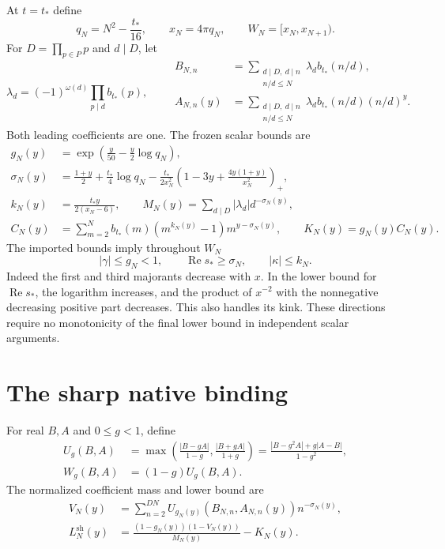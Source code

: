 \documentclass[11pt]{article}
\theoremstyle{remark}
\newcommand{\tstar}{t_*}
\newcommand{\Lsharp}{L_N^{\mathrm{sh}}}
\newcommand{\pos}[1]{\left(#1\right)_+}
\DeclareMathOperator{\Rea}{Re}
\numberwithin{equation}{section}
\begin{document}
At $t=\tstar$ define
\begin{equation}\label{eq:window}
 q_N=N^2-\frac{\tstar}{16},\qquad x_N=4\pi q_N,
 \qquad W_N=[x_N,x_{N+1}).
\end{equation}
For $D=\prod_{p\in P}p$ and $d\mid D$, let
\begin{equation}\label{eq:coeff}
 \lambda_d=(-1)^{\omega(d)}\prod_{p\mid d}b_{\tstar}(p),\qquad
 \begin{aligned}
 B_{N,n}&=\sum_{\substack{d\mid D,\ d\mid n\\ n/d\le N}}
                  \lambda_db_{\tstar}(n/d),\\
 A_{N,n}(y)&=\sum_{\substack{d\mid D,\ d\mid n\\ n/d\le N}}
                  \lambda_db_{\tstar}(n/d)(n/d)^y .
 \end{aligned}
\end{equation}
Both leading coefficients are one. The frozen scalar bounds are
\begin{align}
 g_N(y)&=\exp\!\left(\frac y{50}-\frac y2\log q_N\right),\label{eq:g}\\
 \sigma_N(y)&=\frac{1+y}{2}+\frac{\tstar}{4}\log q_N
 -\frac{\tstar}{2x_N^2}
 \pos{1-3y+\frac{4y(1+y)}{x_N^2}},\label{eq:sigma}\\
 k_N(y)&=\frac{\tstar y}{2(x_N-6)},\qquad
 M_N(y)=\sum_{d\mid D}|\lambda_d|d^{-\sigma_N(y)},\label{eq:M}\\
 C_N(y)&=\sum_{m=2}^N b_{\tstar}(m)(m^{k_N(y)}-1)m^{y-\sigma_N(y)},
 \qquad K_N(y)=g_N(y)C_N(y).\label{eq:K}
\end{align}
The imported bounds imply throughout $W_N$
\begin{equation}\label{eq:freeze}
 |\gamma|\le g_N<1,\qquad \Rea s_*\ge\sigma_N,
 \qquad |\kappa|\le k_N.
\end{equation}
Indeed the first and third majorants decrease with $x$. In the lower
bound for $\Rea s_*$, the logarithm increases, and the product of
$x^{-2}$ with the nonnegative decreasing positive part decreases. This
also handles its kink. These directions require no monotonicity of the
final lower bound in independent scalar arguments.

\section{The sharp native binding}\label{sec:binding}

For real $B,A$ and $0\le g<1$, define
\begin{align}
 U_g(B,A)&=\max\!\left(\frac{|B-gA|}{1-g},\frac{|B+gA|}{1+g}\right)
 =\frac{|B-g^2A|+g|A-B|}{1-g^2},\label{eq:U}\\
 W_g(B,A)&=(1-g)U_g(B,A).
 \label{eq:weight}
\end{align}
The normalized coefficient mass and lower bound are
\begin{align}
 V_N(y)&=\sum_{n=2}^{DN}U_{g_N(y)}(B_{N,n},A_{N,n}(y))n^{-\sigma_N(y)},
 \label{eq:V}\\
 \Lsharp(y)&=\frac{(1-g_N(y))(1-V_N(y))}{M_N(y)}-K_N(y).
 \label{eq:Lsharp}
\end{align}
\end{document}
